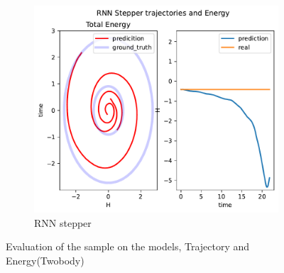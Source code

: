 \begin{figure}[H]
\begin{subfigure}[b]{0.3\textwidth}
		\centering
		\includegraphics[width=\textwidth]{chapters/chapter5/body2_rne_traj.pdf}
		\caption{RNN stepper}
	\end{subfigure}
	
	\caption{Evaluation of the sample on the models, Trajectory and Energy(Twobody)}
	\label{body2_traj}
\end{figure}

